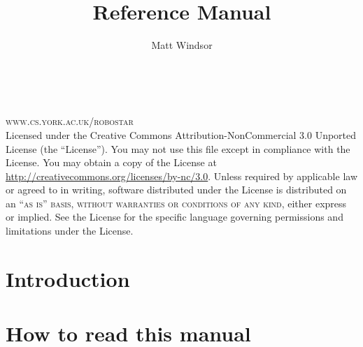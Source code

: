 \documentclass[11pt]{book}
\title{\langname{} Reference Manual}
\author{Matt Windsor}
\begin{document}
\frontmatter

%
%

\begingroup                                                                     
\makeatletter
\thispagestyle{empty} %
\makeatother
\vfill
\endgroup

%
%

\newpage
~\vfill
\thispagestyle{empty}

\noindent \textsc{www.cs.york.ac.uk/robostar}\\

\noindent Licensed under the Creative Commons
Attribution-NonCommercial 3.0 Unported License (the ``License''). You
may not use this file except in compliance with the License. You may
obtain a copy of the License at
\url{http://creativecommons.org/licenses/by-nc/3.0}. Unless required
by applicable law or agreed to in writing, software distributed under
the License is distributed on an \textsc{``as is'' basis, without
  warranties or conditions of any kind}, either express or
implied. See the License for the specific language governing
permissions and limitations under the License.\\


%
%

\usechapterimagefalse
\pagestyle{empty} %
\tableofcontents %
\cleardoublepage %
\pagestyle{fancy} %

%
%

\chapter{Introduction}


\chapter{How to read this manual}

\end{document}
